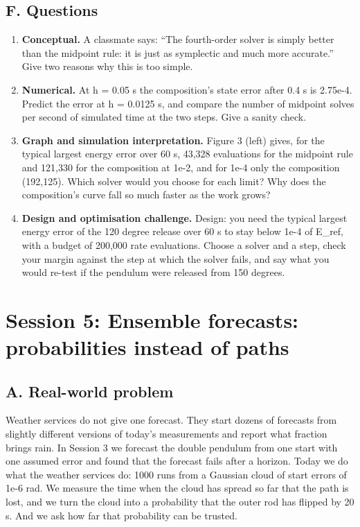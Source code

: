 \documentclass[11pt,a4paper]{article}
\begin{document}
\subsection*{F. Questions}
\begin{enumerate}[nosep]
\item \textbf{Conceptual.} A classmate says: ``The fourth-order solver is simply better than the midpoint rule: it is just as symplectic and much more accurate.'' Give two reasons why this is too simple.
\item \textbf{Numerical.} At h = 0.05 s the composition's state error after 0.4 s is 2.75e-4. Predict the error at h = 0.0125 s, and compare the number of midpoint solves per second of simulated time at the two steps. Give a sanity check.
\item \textbf{Graph and simulation interpretation.} Figure 3 (left) gives, for the typical largest energy error over 60 s, 43,328 evaluations for the midpoint rule and 121,330 for the composition at 1e-2, and for 1e-4 only the composition (192,125). Which solver would you choose for each limit? Why does the composition's curve fall so much faster as the work grows?
\item \textbf{Design and optimisation challenge.} Design: you need the typical largest energy error of the 120 degree release over 60 s to stay below 1e-4 of E\_ref, with a budget of 200,000 rate evaluations. Choose a solver and a step, check your margin against the step at which the solver fails, and say what you would re-test if the pendulum were released from 150 degrees.
\end{enumerate}

\section{Session 5: Ensemble forecasts: probabilities instead of paths}

\subsection*{A. Real-world problem}
Weather services do not give one forecast. They start dozens of forecasts from slightly different versions of today's measurements and report what fraction brings rain. In Session 3 we forecast the double pendulum from one start with one assumed error and found that the forecast fails after a horizon. Today we do what the weather services do: 1000 runs from a Gaussian cloud of start errors of 1e-6 rad. We measure the time when the cloud has spread so far that the path is lost, and we turn the cloud into a probability that the outer rod has flipped by 20 s. And we ask how far that probability can be trusted.
\end{document}
